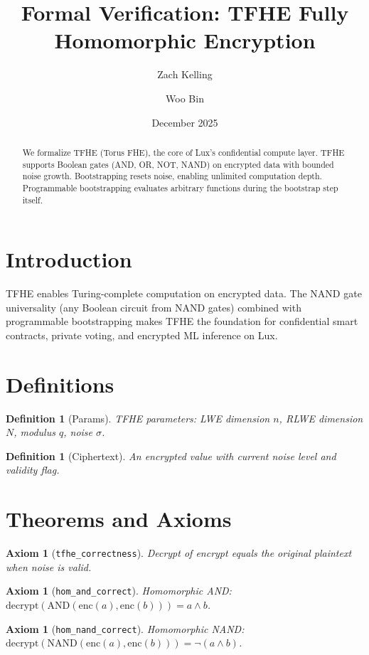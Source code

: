 \documentclass[11pt]{article}
\title{Formal Verification: TFHE Fully Homomorphic Encryption}
\author{Zach Kelling \and Woo Bin}
\date{December 2025}
\newtheorem{definition}[theorem]{Definition}
\newtheorem{axiom_stmt}[theorem]{Axiom}
\begin{document}
\maketitle

\begin{abstract}
We formalize TFHE (Torus FHE), the core of Lux's confidential compute layer. TFHE supports Boolean gates (AND, OR, NOT, NAND) on encrypted data with bounded noise growth. Bootstrapping resets noise, enabling unlimited computation depth. Programmable bootstrapping evaluates arbitrary functions during the bootstrap step itself.
\end{abstract}

\section{Introduction}
TFHE enables Turing-complete computation on encrypted data. The NAND gate universality (any Boolean circuit from NAND gates) combined with programmable bootstrapping makes TFHE the foundation for confidential smart contracts, private voting, and encrypted ML inference on Lux.

\section{Definitions}
\begin{definition}[Params]
TFHE parameters: LWE dimension $n$, RLWE dimension $N$, modulus $q$, noise $\sigma$.
\end{definition}

\begin{definition}[Ciphertext]
An encrypted value with current noise level and validity flag.
\end{definition}


\section{Theorems and Axioms}
\begin{axiom_stmt}[\texttt{tfhe\_correctness}]
Decrypt of encrypt equals the original plaintext when noise is valid.
\end{axiom_stmt}

\begin{axiom_stmt}[\texttt{hom\_and\_correct}]
Homomorphic AND: $\text{decrypt}(\text{AND}(\text{enc}(a), \text{enc}(b))) = a \wedge b$.
\end{axiom_stmt}

\begin{axiom_stmt}[\texttt{hom\_nand\_correct}]
Homomorphic NAND: $\text{decrypt}(\text{NAND}(\text{enc}(a), \text{enc}(b))) = \neg(a \wedge b)$.
\end{axiom_stmt}
\end{document}
